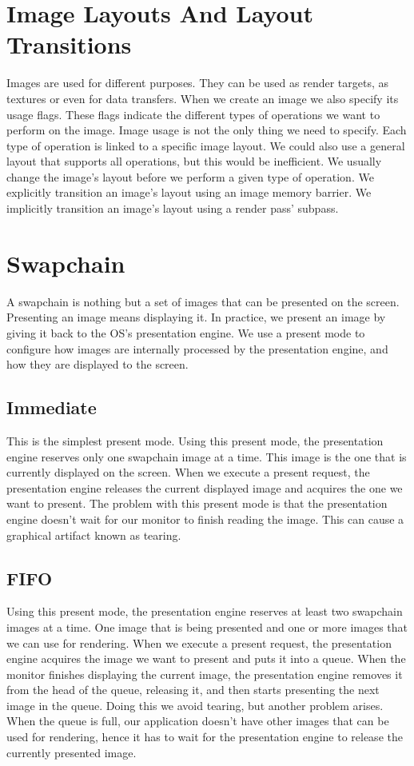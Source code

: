 \section{Image Layouts And Layout Transitions}

Images are used for different purposes.
They can be used as render targets, as textures or even for data transfers.
When we create an image we also specify its usage flags.
These flags indicate the different types of operations we want to perform
on the image.
Image usage is not the only thing we need to specify.
Each type of operation is linked to a specific image layout.
We could also use a general layout that supports all operations, but this
would be inefficient.
We usually change the image's layout before we perform a given type of
operation.
We explicitly transition an image's layout using an image memory barrier.
We implicitly transition an image's layout using a render pass' subpass.

\section{Swapchain}

A swapchain is nothing but a set of images that can be presented on the screen.
Presenting an image means displaying it.
In practice, we present an image by giving it back to the OS's presentation engine.
We use a present mode to configure how images are internally processed by
the presentation engine, and how they are displayed to the screen.

\subsection{Immediate}

This is the simplest present mode.
Using this present mode, the presentation engine reserves only one swapchain
image at a time.
This image is the one that is currently displayed on the screen.
When we execute a present request, the presentation engine releases
the current displayed image and acquires the one we want to present.
The problem with this present mode is that the presentation engine doesn't
wait for our monitor to finish reading the image.
This can cause a graphical artifact known as tearing.

\subsection{FIFO}

Using this present mode, the presentation engine reserves at least two
swapchain images at a time.
One image that is being presented and one or more images that we can use for
rendering.
When we execute a present request, the presentation engine acquires
the image we want to present and puts it into a queue.
When the monitor finishes displaying the current image, the presentation engine
removes it from the head of the queue, releasing it, and then starts
presenting the next image in the queue.
Doing this we avoid tearing, but another problem arises.
When the queue is full, our application doesn't have other images that can
be used for rendering, hence it has to wait for the presentation engine
to release the currently presented image.


